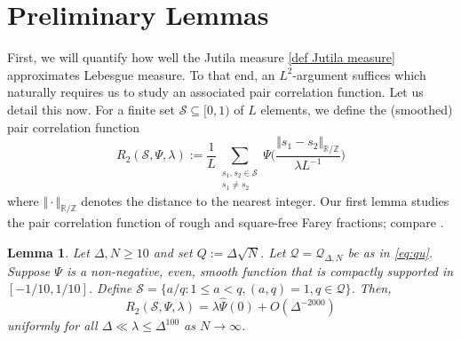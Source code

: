 \documentclass[12pt,reqno]{amsart}
\theoremstyle{plain}
\newtheorem{lemma}{Lemma}
\numberwithin{equation}{section}
\numberwithin{figure}{section}
\theoremstyle{plain}
\theoremstyle{definition}
\theoremstyle{remark}
\begin{document}
\section{Preliminary Lemmas}
First, we will quantify how well the Jutila measure 
\eqref{def Jutila measure} approximates
Lebesgue measure. To that end,
an $L^2$-argument suffices
which naturally requires us to study an associated
pair correlation function. Let us detail this now.
For a finite set $\mathcal{S}\subseteq [0,1)$ of $L$ elements,
we define the (smoothed) pair correlation function 
$$
R_2(\mathcal{S},\Psi,\lambda):= 
\frac{1}{L} \sum_{\substack{s_1, s_2\in \mathcal{S}\\ s_1\neq s_2}} 
\Psi\Big(\frac{\Vert s_1 - s_2 \Vert_{\mathbb{R}/\mathbb{Z}}}
{\lambda L^{-1}}\Big)
$$
where $\Vert \cdot \Vert_{\mathbb{R}/\mathbb{Z}}$
denotes the distance to the nearest integer.
Our first lemma studies 
the pair correlation function of rough and square-free
Farey fractions;
compare \cite[Thm. 2]{boca2005correlations}.
\begin{lemma}\label{le:paircorrel}
 Let $\Delta, N \geq 10$ and set 
 $Q := \Delta \sqrt{N}$. 
  Let $\mathcal{Q}=\mathcal{Q}_{\Delta,N}$ 
  be as in \eqref{eq:qu}. Suppose $\Psi$
  is a non-negative, even, 
  smooth function that is compactly supported in 
  $[-1 / 10,1 / 10]$.
  Define $\mathcal{S}=\{a/q: 
  1\leq a < q, (a,q)=1, q\in \mathcal{Q}\}$. Then,
  \begin{equation}\label{eq:paircorrelasymp}
    R_2(\mathcal{S},\Psi,\lambda) = 
    \lambda \widehat{\Psi}(0) + O(\Delta^{-2000})  
  \end{equation}
uniformly for all $\Delta\ll \lambda \leq \Delta^{100}$ as $N \rightarrow \infty$.
\end{lemma}
\end{document}
